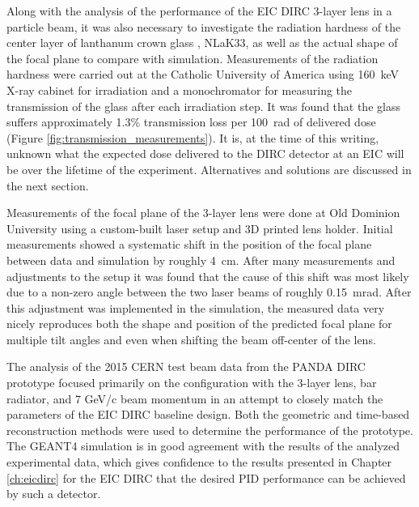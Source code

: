 Along with the analysis of the performance of the EIC DIRC 3-layer lens in a particle beam, it was also necessary to investigate the radiation hardness of the center layer of lanthanum crown glass \cite{SchottData}, NLaK33, as well as the actual shape of the focal plane to compare with simulation. Measurements of the radiation hardness were carried out at the Catholic University of America using  160~keV X-ray cabinet \cite{XRayCabinet} for irradiation and a monochromator \cite{Monochromator} for measuring the transmission of the glass after each irradiation step. It was found that the glass suffers approximately 1.3\% transmission loss per 100~rad of delivered dose (Figure \ref{fig:transmission_measurements}). It is, at the time of this writing, unknown what the expected dose delivered to the DIRC detector at an EIC will be over the lifetime of the experiment. Alternatives and solutions are discussed in the next section.

Measurements of the focal plane of the 3-layer lens were done at Old Dominion University using a custom-built laser setup and 3D printed lens holder. Initial measurements showed a systematic shift in the position of the focal plane between data and simulation by roughly 4~cm. After many measurements and adjustments to the setup it was found that the cause of this shift was most likely due to a non-zero angle between the two laser beams of roughly 0.15~mrad. After this adjustment was implemented in the simulation, the measured data very nicely reproduces both the shape and position of the predicted focal plane for multiple tilt angles and even when shifting the beam off-center of the lens.

The analysis of the 2015 CERN test beam data from the PANDA DIRC prototype focused primarily on the configuration with the 3-layer lens, bar radiator, and 7 GeV/c beam momentum in an attempt to closely match the parameters of the EIC DIRC baseline design. Both the geometric and time-based reconstruction methods were used to determine the performance of the prototype. The GEANT4 simulation is in good agreement with the results of the analyzed experimental data, which gives confidence to the results presented in Chapter \ref{ch:eicdirc} for the EIC DIRC that the desired PID performance can be achieved by such a detector. 

